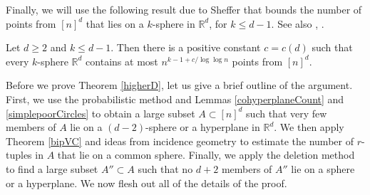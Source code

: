 %
%
Finally, we will use the following result due to Sheffer that bounds the number of points from $[n]^d$ that lies on a $k$-sphere in $\mathbb{R}^d$, for $k \leq d-1$.  See also \cite[Sec.~11.2, Equation~11.9]{iwaniec}, \cite[Theorem~2]{shel}.
%
%
%
%
\begin{lemma}\label{simplepoorCircles} Let $d \geq 2$ and $k\leq d-1$. 
 Then there is a positive constant $c = c(d)$ such that every $k$-sphere $\mathbb{R}^d$ contains at most $n^{k-1 + c/\log\log n }$ points from $[n]^d$.  
%
\end{lemma}
%
%
%
%
%
\medskip
%
%
Before we prove Theorem \ref{higherD}, let us give a brief outline of the argument.  First, we use the probabilistic method and Lemmas \ref{cohyperplaneCount} and \ref{simplepoorCircles} to obtain a large subset $A\subset [n]^d$ such that very few members of $A$ lie on a $(d-2)$-sphere or a hyperplane in $\mathbb{R}^d$.  We then apply Theorem \ref{bipVC} and ideas from incidence geometry to estimate the number of $r$-tuples in $A$ that lie on a common sphere.  Finally, we apply the deletion method to find a large subset $A'' \subset A$ such that no $d+2$ members of $A''$ lie on a sphere or a hyperplane.  We now flesh out all of the details of the proof.
\medskip
%
